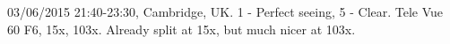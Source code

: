 \item 03/06/2015 21:40-23:30, Cambridge, UK. 1 - Perfect seeing, 5 - Clear. Tele Vue 60 F6, 15x, 103x. Already split at 15x, but much nicer at 103x. 
